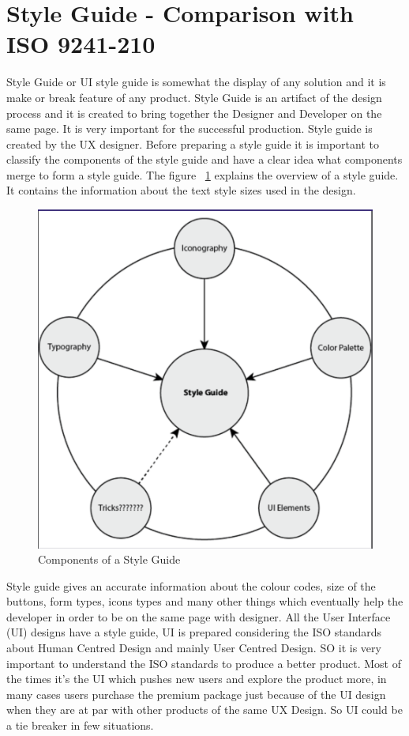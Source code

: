 \section{Style Guide - Comparison with ISO 9241-210}
Style Guide or UI style guide is somewhat the display of any solution and it is make or break feature of any product. Style Guide is an artifact of the design process and it  is created to bring together the Designer and Developer on the same page. It is very important for the successful production. Style guide is created by the UX designer. Before preparing a style guide it is important to classify the components of the style guide and have a clear idea what components merge to form a style guide. The figure ~\ref {fig:style}  explains the overview of a style guide. It contains the information about the text style sizes used in the design. \par
\begin{figure}[htbp]
\begin{center}
\includegraphics[width=4 in, height=3 in]{style.png}
\caption{Components of a Style Guide~\cite{sguide}}
\label{fig:style}
\end{center}
\end{figure}
Style guide gives an accurate information about the colour codes, size of the buttons, form types, icons types and many other things which eventually help the developer in order to be on the same page with designer. All the User Interface (UI) designs have a style guide, UI is prepared considering the ISO standards about Human Centred Design and mainly User Centred Design.  SO it is very important to understand the ISO standards to produce a better product. Most of the times it's the UI  which pushes new users and explore the product more, in many cases users purchase the premium package just because of the UI design when they are at par with other products of the same UX Design.  So UI could be a tie breaker in few situations. \par
